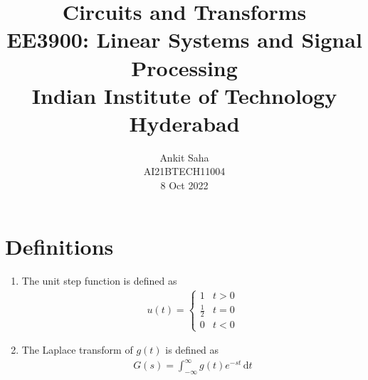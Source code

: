 \documentclass[journal,12pt,twocolumn]{IEEEtran}
\title{Circuits and Transforms \\ \Large EE3900: Linear Systems and Signal Processing \\ \large Indian Institute of Technology Hyderabad}
\author{Ankit Saha \\ \normalsize AI21BTECH11004 \\ \vspace*{20pt} \normalsize 8 Oct 2022}
\providecommand{\der}[1]{\mathrm{d} #1}
\numberwithin{equation}{section}
\numberwithin{figure}{section}
\renewcommand\thesection{\arabic{section}}
\begin{document}
	\maketitle

	\section{Definitions}
	\begin{enumerate}[label=\thesection.\arabic*,ref=\thesection.\theenumi]
	\item The unit step function is defined as
	\begin{align}
		u(t) =
		\begin{cases}
			1 & t > 0 \\
			\frac{1}{2} & t = 0 \\
			0 & t < 0
		\end{cases}
	\end{align}
		
	\item The Laplace transform of $g(t)$ is defined as 
	\begin{align}
		G(s) = \int_{-\infty}^{\infty} g(t) e^{-st}\, \der{t}
	\end{align}
	\end{enumerate}
	
\end{document}
